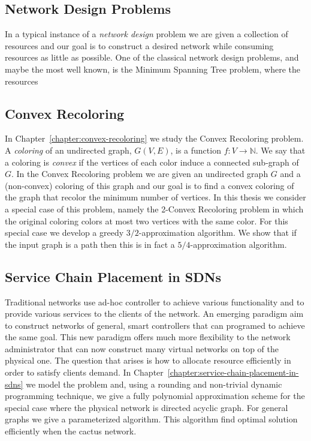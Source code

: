 \subsection{Network Design Problems}
In a typical instance of a \emph{network design} problem we are given a collection of resources and our goal is to construct a desired network while consuming resources as little as possible.
One of the classical network design problems, and maybe the most well known, is the Minimum Spanning Tree problem, where the resources 




\subsection*{Convex Recoloring} 
In Chapter~\ref{chapter:convex-recoloring} we study the Convex Recoloring problem.
A \emph{coloring} of an undirected graph, $G(V, E)$, is a function $f:V \to \mathbb{N}$.
We say that a coloring is \emph{convex} if the vertices of each color induce a connected sub-graph of $G$.
In the Convex Recoloring problem we are given an undirected graph $G$ and a (non-convex) coloring of this graph and our goal is to find a convex coloring of the graph that recolor the minimum number of vertices.
In this thesis we consider a special case of this problem, namely the 2-Convex Recoloring problem in which the original coloring colors at most two vertices with the same color.
For this special case we develop a greedy $3/2$-approximation algorithm.
We show that if the input graph is a path then this is in fact a $5/4$-approximation algorithm.


\subsection*{Service Chain Placement in SDNs} 
Traditional networks use ad-hoc controller to achieve various functionality and to provide various services to the clients of the network.
An emerging paradigm aim to construct networks of general, smart controllers that can programed to achieve the same goal. 
This new paradigm offers much more flexibility to the network administrator that can now construct many virtual networks on top of the physical one.
The question that arises is how to allocate resource efficiently in order to satisfy clients demand.
In Chapter~\ref{chapter:service-chain-placement-in-sdns} we model the problem and, using a rounding and non-trivial dynamic programming technique, we give a fully polynomial approximation scheme for the special case where the physical network is directed acyclic graph. 
For general graphs we give a parameterized algorithm.
This algorithm find optimal solution efficiently when the cactus network.

